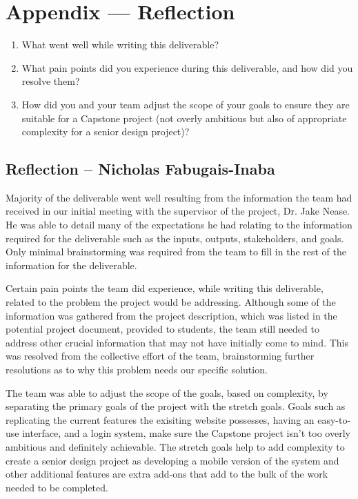 \documentclass{article}
\begin{document}
\newpage{}

\section*{Appendix --- Reflection}




\begin{enumerate}
    \item What went well while writing this deliverable? 
    \item What pain points did you experience during this deliverable, and how
    did you resolve them?
    \item How did you and your team adjust the scope of your goals to ensure
    they are suitable for a Capstone project (not overly ambitious but also of
    appropriate complexity for a senior design project)?
\end{enumerate}

\subsection*{Reflection -- Nicholas Fabugais-Inaba}

Majority of the deliverable went well resulting from the information
the team had received in our initial meeting with the supervisor of the
project, Dr. Jake Nease. He was able to detail many of the expectations
he had relating to the information required for the deliverable such as
the inputs, outputs, stakeholders, and goals. Only minimal brainstorming
was required from the team to fill in the rest of the information for the
deliverable. \newline

Certain pain points the team did experience, while writing this deliverable,
related to the problem the project would be addressing. Although some of
the information was gathered from the project description, which was listed
in the potential project document, provided to students, the team
still needed to address other crucial information that may not have
initially come to mind. This was resolved from the collective effort of
the team, brainstorming further resolutions as to why this problem needs
our specific solution. \newline

The team was able to adjust the scope of the goals, based on complexity,
by separating the primary goals of the project with the stretch goals.
Goals such as replicating the current features the exisiting website
possesses, having an easy-to-use interface, and a login system, make sure
the Capstone project isn't too overly ambitious and definitely achievable.
The stretch goals help to add complexity to create a senior design project
as developing a mobile version of the system and other additional features
are extra add-ons that add to the bulk of the work needed to be completed.
\end{document}
